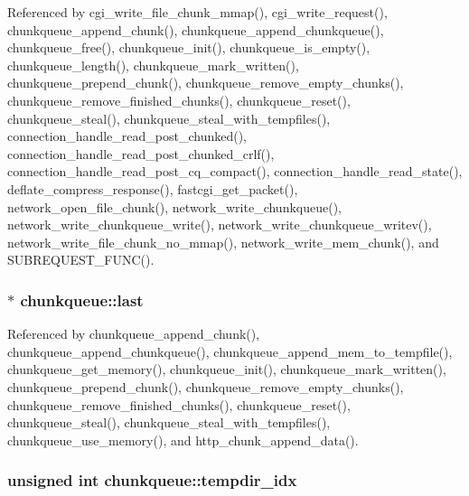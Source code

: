 Referenced by cgi\-\_\-write\-\_\-file\-\_\-chunk\-\_\-mmap(), cgi\-\_\-write\-\_\-request(), chunkqueue\-\_\-append\-\_\-chunk(), chunkqueue\-\_\-append\-\_\-chunkqueue(), chunkqueue\-\_\-free(), chunkqueue\-\_\-init(), chunkqueue\-\_\-is\-\_\-empty(), chunkqueue\-\_\-length(), chunkqueue\-\_\-mark\-\_\-written(), chunkqueue\-\_\-prepend\-\_\-chunk(), chunkqueue\-\_\-remove\-\_\-empty\-\_\-chunks(), chunkqueue\-\_\-remove\-\_\-finished\-\_\-chunks(), chunkqueue\-\_\-reset(), chunkqueue\-\_\-steal(), chunkqueue\-\_\-steal\-\_\-with\-\_\-tempfiles(), connection\-\_\-handle\-\_\-read\-\_\-post\-\_\-chunked(), connection\-\_\-handle\-\_\-read\-\_\-post\-\_\-chunked\-\_\-crlf(), connection\-\_\-handle\-\_\-read\-\_\-post\-\_\-cq\-\_\-compact(), connection\-\_\-handle\-\_\-read\-\_\-state(), deflate\-\_\-compress\-\_\-response(), fastcgi\-\_\-get\-\_\-packet(), network\-\_\-open\-\_\-file\-\_\-chunk(), network\-\_\-write\-\_\-chunkqueue(), network\-\_\-write\-\_\-chunkqueue\-\_\-write(), network\-\_\-write\-\_\-chunkqueue\-\_\-writev(), network\-\_\-write\-\_\-file\-\_\-chunk\-\_\-no\-\_\-mmap(), network\-\_\-write\-\_\-mem\-\_\-chunk(), and S\-U\-B\-R\-E\-Q\-U\-E\-S\-T\-\_\-\-F\-U\-N\-C().

\hypertarget{structchunkqueue_a17696b40547c499d7aedec5e7025feb8}{
\subsubsection[{last}]{$\ast$ chunkqueue\-::last}}\label{structchunkqueue_a17696b40547c499d7aedec5e7025feb8}


Referenced by chunkqueue\-\_\-append\-\_\-chunk(), chunkqueue\-\_\-append\-\_\-chunkqueue(), chunkqueue\-\_\-append\-\_\-mem\-\_\-to\-\_\-tempfile(), chunkqueue\-\_\-get\-\_\-memory(), chunkqueue\-\_\-init(), chunkqueue\-\_\-mark\-\_\-written(), chunkqueue\-\_\-prepend\-\_\-chunk(), chunkqueue\-\_\-remove\-\_\-empty\-\_\-chunks(), chunkqueue\-\_\-remove\-\_\-finished\-\_\-chunks(), chunkqueue\-\_\-reset(), chunkqueue\-\_\-steal(), chunkqueue\-\_\-steal\-\_\-with\-\_\-tempfiles(), chunkqueue\-\_\-use\-\_\-memory(), and http\-\_\-chunk\-\_\-append\-\_\-data().

\hypertarget{structchunkqueue_a27d89bfcf310b4640fae3c84684b24cb}{
\subsubsection[{tempdir\-\_\-idx}]{\setlength{\rightskip}{0pt plus 5cm}unsigned int chunkqueue\-::tempdir\-\_\-idx}}\label{structchunkqueue_a27d89bfcf310b4640fae3c84684b24cb}


